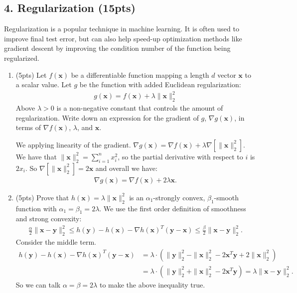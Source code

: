 \documentclass[10pt]{article}
\newcommand{\bv}[1]{\mathbf{#1}}
\begin{document}
\subsection{4. Regularization (\textbf{\small 15pts})}
Regularization is a popular technique in machine learning. It is often used to improve final test error, but can also help speed-up optimization methods like gradient descent by improving the condition number of the function being regularized.

\begin{enumerate}[label=(\alph*)]
	\item (5pts) Let $f(\bv{x})$ be a differentiable function mapping a length $d$ vector $\bv{x}$ to a scalar value. Let $g$ be the function with added Euclidean regularization:
	\begin{align*}
		g(\bv{x}) = f(\bv{x}) + \lambda \|\bv{x}\|_2^2
	\end{align*}  Above $\lambda > 0$ is a non-negative constant that controls the amount of regularization. Write down an expression for the gradient of $g$, $\nabla g(\bv{x})$, in terms of $\nabla f(\bv{x})$, $\lambda$, and $\bv{x}$.

	We applying linearity of the gradient. $\nabla g(\bv{x}) =\nabla  f(\bv{x}) + \lambda \nabla\left[\|\bv{x}\|_2^2\right]$. We have that $\|\bv{x}\|_2^2 = \sum_{i=1}^n x_i^2$, so the partial derivative with respect to $i$ is $2x_i$. So $\nabla\left[\|\bv{x}\|_2^2\right]  = 2\bv{x}$ and overall we have:
	\begin{align*}
		\nabla g(\bv{x}) = \nabla  f(\bv{x}) + 2\lambda \bv{x}.
	\end{align*}
	
	\item (5pts) Prove that $h(\bv{x}) =  \lambda \|\bv{x}\|_2^2$ is an $\alpha_1$-strongly convex, $\beta_1$-smooth function with $\alpha_1 = \beta_1 = 2\lambda$. 
We use the first order definition of smoothness and strong convexity:
\begin{align*}
	\frac{\alpha}{2}\|\bv{x}-\bv{y}\|_2^2 \leq h(\bv{y})-h(\bv{x}) - \nabla h(\bv{x})^T(\bv{y} - \bv{x}) \leq \frac{\beta}{2}\|\bv{x}-\bv{y}\|_2^2.
\end{align*}
Consider the middle term.  
\begin{align*}
	h(\bv{y})-h(\bv{x}) - \nabla h(\bv{x})^T(\bv{y} - \bv{x}) &= \lambda \cdot \left(\|\bv{y}\|_2^2 - \|\bv{x}\|_2^2 - 2\bv{x}^T\bv{y} + 2\|\bv{x}\|_2^2\right)\\
	&=\lambda \cdot \left(\|\bv{y}\|_2^2 + \|\bv{x}\|_2^2 - 2\bv{x}^T\bv{y}\right) = \lambda \|\bv{x} - \bv{y}\|_2^2.
\end{align*}
So we can talk $\alpha = \beta = 2\lambda$ to make the above inequality true.
	

\end{enumerate}
\end{document}
